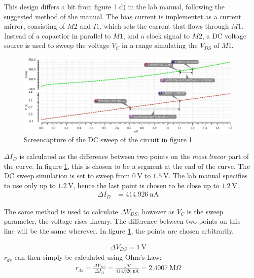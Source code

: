 \documentclass[onecolumn]{article}
\begin{document}
This design differs a bit from figure 1 d) in the lab manual, following the suggested method of the manual. The bias current is implementet as a current mirror, consisting of $M2$ and $I1$, which sets the current that flows through $M1$. Instead of a capactior in parallel to $M1$, and a clock signal to $M2$, a DC voltage source is used to sweep the voltage $V_C$ in a range simulating the $V_{DS}$ of $M1$. 

\clearpage 

\begin{figure}[h!]
    \centering
    \includegraphics[width=1\textwidth]{plot_circuit_c_FINAL.png}
    \caption{Screencapture of the DC sweep of the circuit in figure 1.}
    \label{fig:plotc}
\end{figure}

$\Delta I_D$ is calculated as the difference between two points on the \textit{most linear} part of the curve. In figure \ref{fig:plotc}, this is chosen to be a segment at the end of the curve. The DC sweep simulation is set to sweep from $0 \ \text{V}$ to $1.5 \ \text{V}$. The lab manual specifies to use only up to $1.2 \ \text{V}$, hence the last point is chosen to be close up to $1.2 \ \text{V}$.
\begin{align}
    \Delta I_D &= 414.926 \ \text{nA}
\end{align}

The same method is used to calculate $\Delta V_{DS}$, however as $V_C$ is the sweep parameter, the voltage rises lineary. The difference between two points on this line will be the same wherever. In figure \ref{fig:plotc}, the points are chosen arbitrarily.

\begin{align}
    \Delta V_{DS} = 1 \ \text{V}
\end{align}
$r_{ds}$ can then simply be calculated using Ohm's Law:
\begin{align}
    r_{ds} = \frac{\Delta V_{DS}}{\Delta  I_D} = \frac{ 1 \ \text{V}}{414.926 \ \text{nA}} = 2.4007 \ \text{M}\Omega
\end{align}
\end{document}
